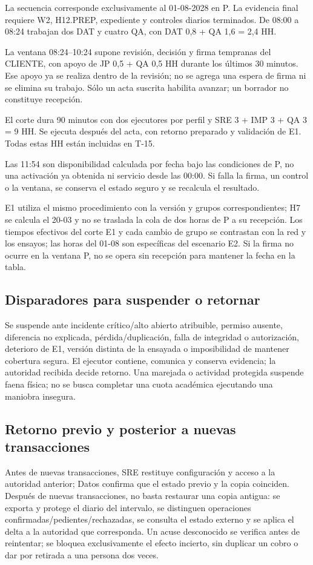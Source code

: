 La secuencia corresponde exclusivamente al 01-08-2028 en P. La evidencia final requiere W2, H12.PREP, expediente y controles diarios terminados. De 08:00 a 08:24 trabajan dos DAT y cuatro QA, con DAT 0,8 + QA 1,6 = 2,4 HH.

La ventana 08:24--10:24 supone revisión, decisión y firma tempranas del CLIENTE, con apoyo de JP 0,5 + QA 0,5 HH durante los últimos 30 minutos. Ese apoyo ya se realiza dentro de la revisión; no se agrega una espera de firma ni se elimina su trabajo. Sólo un acta suscrita habilita avanzar; un borrador no constituye recepción.

El corte dura 90 minutos con dos ejecutores por perfil y SRE 3 + IMP 3 + QA 3 = 9 HH. Se ejecuta después del acta, con retorno preparado y validación de E1. Todas estas HH están incluidas en T-15.

Las 11:54 son disponibilidad calculada por fecha bajo las condiciones de P, no una activación ya obtenida ni servicio desde las 00:00. Si falla la firma, un control o la ventana, se conserva el estado seguro y se recalcula el resultado.



E1 utiliza el mismo procedimiento con la versión y grupos correspondientes; H7 se calcula el 20-03 y no se traslada la cola de dos horas de P a su recepción. Los tiempos efectivos del corte E1 y cada cambio de grupo se contrastan con la red y los ensayos; las horas del 01-08 son específicas del escenario E2. Si la firma no ocurre en la ventana P, no se opera sin recepción para mantener la fecha en la tabla.

\subsection{Disparadores para suspender o retornar}
Se suspende ante incidente crítico/alto abierto atribuible, permiso ausente, diferencia no explicada, pérdida/duplicación, falla de integridad o autorización, deterioro de E1, versión distinta de la ensayada o imposibilidad de mantener cobertura segura. El ejecutor contiene, comunica y conserva evidencia; la autoridad recibida decide retorno. Una marejada o actividad protegida suspende faena física; no se busca completar una cuota académica ejecutando una maniobra insegura.

\subsection{Retorno previo y posterior a nuevas transacciones}
Antes de nuevas transacciones, SRE restituye configuración y acceso a la autoridad anterior; Datos confirma que el estado previo y la copia coinciden. Después de nuevas transacciones, no basta restaurar una copia antigua: se exporta y protege el diario del intervalo, se distinguen operaciones confirmadas/pedientes/rechazadas, se consulta el estado externo y se aplica el delta a la autoridad que corresponda. Un acuse desconocido se verifica antes de reintentar; se bloquea exclusivamente el efecto incierto, sin duplicar un cobro o dar por retirada a una persona dos veces.

